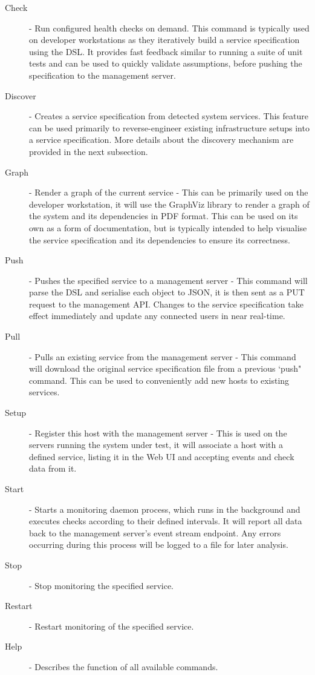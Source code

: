 \documentclass{cshonours}
\begin{document}
\begin{description}
  \item[Check] - Run configured health checks on demand. This command is typically used on developer workstations as they iteratively build a service specification using the DSL\@. It provides fast feedback similar to running a suite of unit tests and can be used to quickly validate assumptions, before pushing the specification to the management server.
  \item[Discover] - Creates a service specification from detected system services. This feature can be used primarily to reverse-engineer existing infrastructure setups into a service specification. More details about the discovery mechanism are provided in the next subsection.
  \item[Graph] - Render a graph of the current service - This can be primarily used on the developer workstation, it will use the GraphViz library to render a graph of the system and its dependencies in PDF format. This can be used on its own as a form of documentation, but is typically intended to help visualise the service specification and its dependencies to ensure its correctness.
  \item[Push] - Pushes the specified service to a management server - This command will parse the DSL and serialise each object to JSON, it is then sent as a PUT request to the management API\@. Changes to the service specification take effect immediately and update any connected users in near real-time.
  \item[Pull] - Pulls an existing service from the management server - This command will download the original service specification file from a previous `push" command. This can be used to conveniently add new hosts to existing services.
  \item[Setup] - Register this host with the management server - This is used on the servers running the system under test, it will associate a host with a defined service, listing it in the Web UI and accepting events and check data from it.
  \item[Start] - Starts a monitoring daemon process, which runs in the background and executes checks according to their defined intervals. It will report all data back to the management server's event stream endpoint. Any errors occurring during this process will be logged to a file for later analysis.
  \item[Stop] - Stop monitoring the specified service.
  \item[Restart] - Restart monitoring of the specified service.
  \item[Help] - Describes the function of all available commands.
\end{description}
\end{document}
